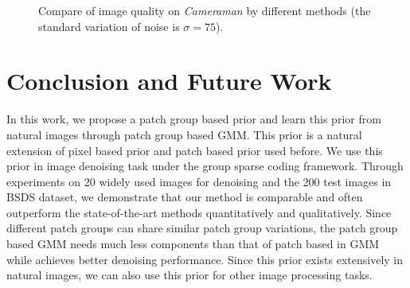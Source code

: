 \documentclass[10pt,twocolumn,letterpaper]{article}
\begin{document}
\begin{figure*}
\centering
{}
\caption{ Compare of image quality on \textsl{Cameraman} by different methods (the standard variation of noise is $\sigma=75$).}
\end{figure*}
\section{Conclusion and Future Work}
In this work, we propose a patch group based prior and learn this prior from natural images through patch group based GMM. This prior is a natural extension of pixel based prior and patch based prior used before. We use this prior in image denoising task under the group sparse coding framework. Through experiments on 20 widely used images for denoising and the 200 test images in BSDS dataset\cite{bsds}, we demonstrate that our method is comparable and often outperform the state-of-the-art methods quantitatively and qualitatively. Since different patch groups can share similar patch group variations, the patch group based GMM needs much less components than that of patch based in GMM\cite{epll} while achieves better denoising performance. Since this prior exists extensively in natural images, we can also use this prior for other image processing tasks. 




\end{document}

